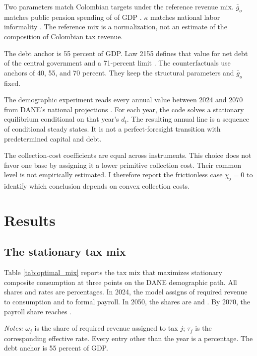 \documentclass[12pt]{article}
\begin{document}
Two parameters match Colombian targets under the reference revenue mix.
$\bar g_o$ matches public pension spending of \BenchmarkOutlayShare{} of GDP
\citep{OECD2023Colombia}. $\kappa$ matches \BenchmarkInformality{} national
labor informality \citep{DANE2025Informality}. The reference mix is a
normalization, not an estimate of the composition of Colombian tax revenue.

The debt anchor is 55 percent of GDP. Law 2155 defines that value for net debt
of the central government and a 71-percent limit \citep{Law2155}. The
counterfactuals use anchors of 40, 55, and 70 percent. They keep the structural
parameters and $\bar g_o$ fixed.

The demographic experiment reads every annual value between 2024 and 2070
from DANE's national projections \citep{DANE2025Projections}. For each year,
the code solves a stationary equilibrium conditional on that year's $d_t$.
The resulting annual line is a sequence of conditional steady states. It is
not a perfect-foresight transition with predetermined capital and debt.

The collection-cost coefficients are equal across instruments. This choice
does not favor one base by assigning it a lower primitive collection cost.
Their common level is not empirically estimated. I therefore report the
frictionless case $\chi_j=0$ to identify which conclusion depends on convex
collection costs.

\section{Results}

\subsection{The stationary tax mix}

Table \ref{tab:optimal_mix} reports the tax mix that maximizes stationary
composite consumption at three points on the DANE demographic path. All
shares and rates are percentages. In 2024, the model assigns
\OptimalConsumptionShareTwentyTwentyFour{} of required revenue to
consumption and \OptimalPayrollShareTwentyTwentyFour{} to formal payroll. In
2050, the shares are \OptimalConsumptionShareTwentyFifty{} and
\OptimalPayrollShareTwentyFifty{}. By 2070, the payroll share reaches
\OptimalPayrollShareTwentySeventy{}.

\begin{table}[H]
\centering
\caption{Stationary optimal tax mix along the demographic path}
\label{tab:optimal_mix}

\begin{minipage}{0.88\textwidth}
\footnotesize
\emph{Notes:} $\omega_j$ is the share of required revenue assigned to tax
$j$; $\tau_j$ is the corresponding effective rate. Every entry other than
the year is a percentage. The debt anchor is 55 percent of GDP.
\end{minipage}
\end{table}
\end{document}

